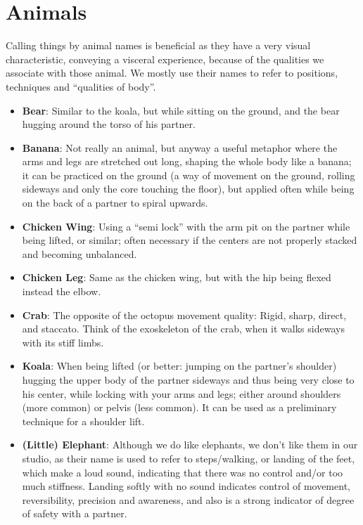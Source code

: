 \section{Animals}\label{sec:animals}

Calling things by animal names is beneficial as they have a very visual characteristic, conveying a visceral experience, because of the qualities we associate with those animal.
We mostly use their names to refer to positions, techniques and ``qualities of body''.

\begin{itemize}
    \item \textbf{Bear}: Similar to the koala, but while sitting on the ground, and the bear hugging around the torso of his partner.
    \item \textbf{Banana}: Not really an animal, but anyway a useful metaphor where the arms and legs are stretched out long, shaping the whole body like a banana; it can be practiced on the ground (a way of movement on the ground, rolling sideways and only the core touching the floor), but applied often while being on the back of a partner to spiral upwards.
    \item \textbf{Chicken Wing}: Using a ``semi lock'' with the arm pit on the partner while being lifted, or similar; often necessary if the centers are not properly stacked and becoming unbalanced.
    \item \textbf{Chicken Leg}: Same as the chicken wing, but with the hip being flexed instead the elbow.
    \item \textbf{Crab}: The opposite of the octopus movement quality: Rigid, sharp, direct, and staccato.
    Think of the exoskeleton of the crab, when it walks sideways with its stiff limbs.
    \item \textbf{Koala}: When being lifted (or better: jumping on the partner's shoulder) hugging the upper body of the partner sideways and thus being very close to his center, while locking with your arms and legs; either around shoulders (more common) or pelvis (less common).
    It can be used as a preliminary technique for a shoulder lift.
    \item \textbf{(Little) Elephant}: Although we do like elephants, we don't like them in our studio, as their name is used to refer to steps/walking, or landing of the feet, which make a loud sound, indicating that there was no control and/or too much stiffness.
    Landing softly with no sound indicates control of movement, reversibility, precision and awareness, and also is a strong indicator of degree of safety with a partner.

\end{itemize}
